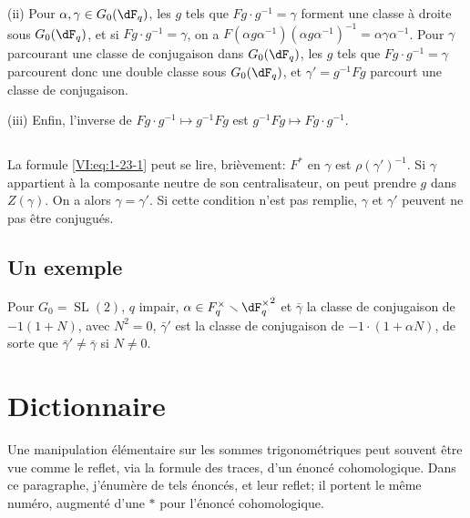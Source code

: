 (ii) Pour $\alpha,\gamma\in G_0(\dF_q)$, les $g$ tels que 
$F g\cdot g^{-1} = \gamma$ forment une classe à droite sous $G_0(\dF_q)$, et 
si $F g\cdot g^{-1} = \gamma$, on a 
$F(\alpha g \alpha^{-1})(\alpha g \alpha^{-1})^{-1} = \alpha \gamma\alpha^{-1}$. 
Pour $\gamma$ parcourant une classe de conjugaison dans $G_0(\dF_q)$, les $g$ 
tels que $F g\cdot g^{-1} = \gamma$ parcourent donc une double classe sous 
$G_0(\dF_q)$, et $\gamma'= g^{-1} F g$ parcourt une classe de conjugaison. 

(iii) Enfin, l'inverse de $F g\cdot g^{-1}\mapsto g^{-1} F g$ est 
$g^{-1} F g\mapsto F g\cdot g^{-1}$. 





\subsection{}\label{VI:1-25}

La formule \eqref{VI:eq:1-23-1} peut se lire, brièvement: $F^\ast$ en 
$\gamma$ est $\rho(\gamma')^{-1}$. Si $\gamma$ appartient à la composante 
neutre de son centralisateur, on peut prendre $g$ dans $Z(\gamma)$. On a alors 
$\gamma=\gamma'$. Si cette condition n'est pas remplie, $\gamma$ et $\gamma'$ 
peuvent ne pas être conjugués. 





\subsection{Un exemple}\label{VI:1-26}

Pour $G_0=\operatorname{SL}(2)$, $q$ impair, 
$\alpha\in F_q^\times\setminus {\dF_q^\times}^2$ et $\bar\gamma$ la classe de 
conjugaison de $-1(1+N)$, avec $N^2=0$, $\bar\gamma'$ est la classe de 
conjugaison de $-1\cdot (1+\alpha N)$, de sorte que $\bar\gamma'\ne \bar\gamma$ 
si $N\ne 0$. 










\section{Dictionnaire}\label{VI:2}

Une manipulation élémentaire sur les sommes trigonométriques peut souvent 
être vue comme le reflet, via la formule des traces, d'un énoncé 
cohomologique. Dans ce paragraphe, j'énumère de tels énoncés, et leur 
reflet; il portent le même numéro, augmenté d'une $\ast$ pour 
l'énoncé cohomologique. 





